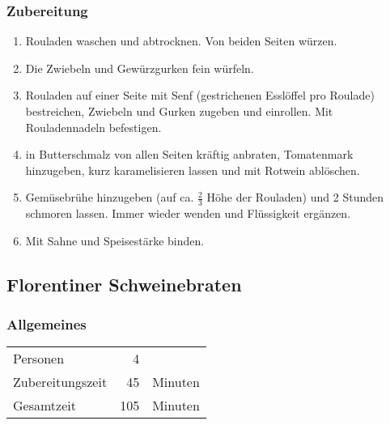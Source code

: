 \subsubsection*{Zubereitung}
\begin{enumerate}
	\item Rouladen waschen und abtrocknen. Von beiden Seiten würzen.
	\item Die Zwiebeln und Gewürzgurken fein würfeln. 
	\item Rouladen auf einer Seite mit Senf (gestrichenen Esslöffel pro Roulade) bestreichen, Zwiebeln und Gurken zugeben und einrollen. Mit Rouladennadeln befestigen.   
	\item in Butterschmalz von allen Seiten kräftig anbraten, Tomatenmark hinzugeben, kurz karamelisieren lassen und mit Rotwein ablöschen.
	\item  Gemüsebrühe hinzugeben (auf ca. $\frac{2}{3}$ Höhe der Rouladen)  und 2 Stunden schmoren lassen. Immer wieder wenden und Flüssigkeit ergänzen.
	\item  Mit Sahne und Speisestärke binden.
\end{enumerate}

\subsection{Florentiner Schweinebraten}
\subsubsection*{Allgemeines}
\begin{tabular}{lrl}
	Personen         &   4 &  \\
	Zubereitungszeit &  45 & Minuten \\
	Gesamtzeit       & 105 & Minuten \\
\end{tabular} 

